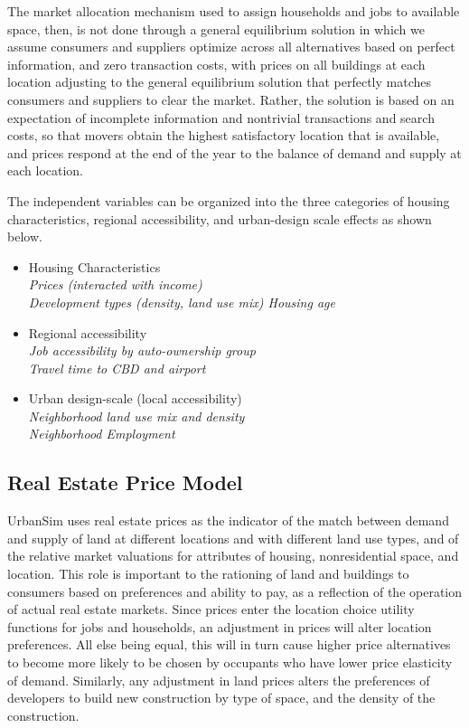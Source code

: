 The market allocation mechanism used to assign households and jobs
to available space, then, is not done through a general
equilibrium solution in which we assume consumers and suppliers
optimize across all alternatives based on perfect information, and
zero transaction costs, with prices on all buildings at each
location adjusting to the general equilibrium solution that
perfectly matches consumers and suppliers to clear the market.
Rather, the solution is based on an expectation of incomplete
information and nontrivial transactions and search costs, so that
movers obtain the highest satisfactory location that is available,
and prices respond at the end of the year to the balance of demand
and supply at each location.

The independent variables can be organized into the three
categories of housing characteristics, regional accessibility, and
urban-design scale effects as shown below.

\begin{itemize}

\item{Housing Characteristics} \\
\emph{Prices (interacted with income) \\
Development types (density, land use mix) Housing age}

\item{Regional accessibility} \\
\emph{Job accessibility by auto-ownership group \\
Travel time to CBD and airport}

\item{Urban design-scale (local accessibility) \\
\emph{Neighborhood land use mix and density \\
Neighborhood Employment}}

\end{itemize}

\subsection{Real Estate Price Model}

UrbanSim uses real estate prices as the indicator of the match between
demand and supply of land at different locations and with
different land use types, and of the relative market valuations
for attributes of housing, nonresidential space, and location.
This role is important to the rationing of land and buildings to
consumers based on preferences and ability to pay, as a reflection
of the operation of actual real estate markets. Since prices enter
the location choice utility functions for jobs and households, an
adjustment in prices will alter location preferences.  All else
being equal, this will in turn cause higher price alternatives to
become more likely to be chosen by occupants who have lower price
elasticity of demand. Similarly, any adjustment in land prices
alters the preferences of developers to build new construction by
type of space, and the density of the construction.

